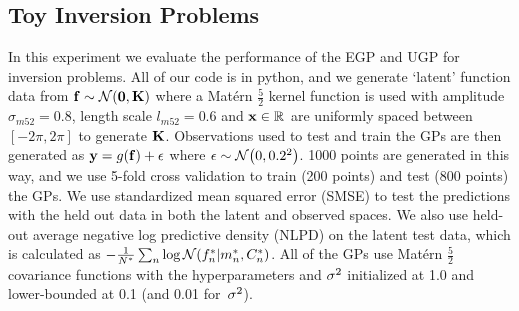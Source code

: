 \documentclass{article} %
\begin{document}
\subsection{Toy Inversion Problems}
\label{sec:exptoy}

In this experiment we evaluate the performance of the EGP and UGP for inversion
problems. All of our code is in python, and we generate `latent' function data
from $\mathbf{f} \sim \mathcal{N}\!\left({\mathbf{0}, \mathbf{K}}\right)$ where a Mat\'ern $\frac{5}{2}$
kernel function is used with amplitude $\sigma_{m52} = 0.8$, length scale
$l_{m52} = 0.6$ and $\mathbf{x} \in \mathbb{R}^{}$ are uniformly spaced between $[-2\pi,
2\pi]$ to generate $\mathbf{K}$. Observations used to test and train the GPs are
then generated as $\mathbf{y} = g\!\left({{\mathbf{f}}}\right) + \epsilon$ where $\epsilon \sim
\mathcal{N}\!\left({0, 0.2^2}\right)$. 1000 points are generated in this way, and we use 5-fold
cross validation to train (200 points) and test (800 points) the GPs. We use
standardized mean squared error (SMSE) to test the predictions with the held
out data in both the latent and observed spaces. We also use held-out average
negative log predictive density (NLPD) on the latent test data, which is
calculated as $-\frac{1}{N^{*}} \sum_{n} \log
\mathcal{N}\!\left({f_n^{*}}\middle\vert{\ensuremath{m}_n\ensuremath{^{*}}, \ensuremath{C}_n\ensuremath{^{*}}}\right)$. All of the GPs use
Mat\'ern $\frac{5}{2}$ covariance functions with the hyperparameters and
$\sigma^2$ initialized at 1.0 and lower-bounded at 0.1 (and 0.01 for~$\sigma^2$).
%
\end{document}
